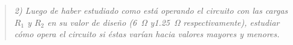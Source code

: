 \begin{quote} \textit{2) Luego de haber estudiado como está operando el circuito con las cargas $R_1$ y $R_2$ en su valor de diseño (\SI{6}{\ohm} y\SI{1.25}{\ohm} respectivamente), estudiar cómo opera el circuito si éstas varían hacia valores mayores y menores.}
\end{quote}
